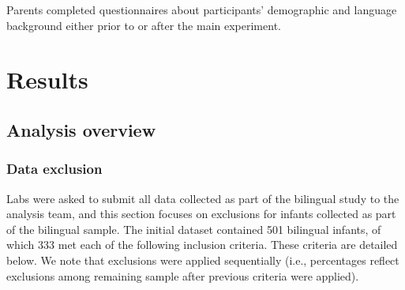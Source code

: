 \documentclass[english,,man,floatsintext]{apa6}
\begin{document}
Parents completed questionnaires about participants' demographic and language background either prior to or after the main experiment.

\hypertarget{results}{%
\section{Results}\label{results}}

\hypertarget{analysis-overview}{%
\subsection{Analysis overview}\label{analysis-overview}}

\hypertarget{data-exclusion}{%
\subsubsection{Data exclusion}\label{data-exclusion}}

Labs were asked to submit all data collected as part of the bilingual study to the analysis team, and this section focuses on exclusions for infants collected as part of the bilingual sample. The initial dataset contained 501 bilingual infants, of which 333 met each of the following inclusion criteria. These criteria are detailed below. We note that exclusions were applied sequentially (i.e., percentages reflect exclusions among remaining sample after previous criteria were applied).
\end{document}

